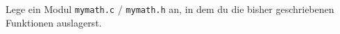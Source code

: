 \begin{aufg}
Lege ein Modul \verb|mymath.c| / \verb|mymath.h| an, in dem du die bisher geschriebenen Funktionen auslagerst.
\end{aufg}
